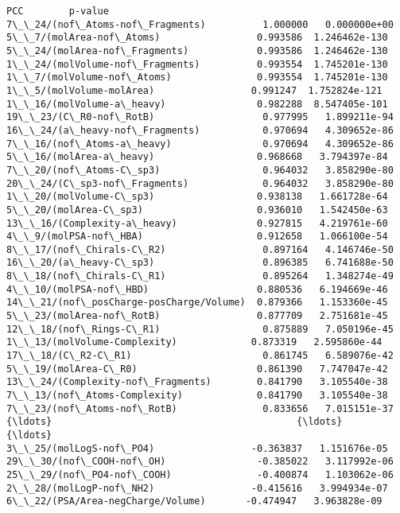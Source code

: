 \documentclass[11pt]{article}
\begin{document}
    \begin{Verbatim}[commandchars=\\\{\}]
                                              PCC        p-value
7\_\_24/(nof\_Atoms-nof\_Fragments)          1.000000   0.000000e+00
5\_\_7/(molArea-nof\_Atoms)                 0.993586  1.246462e-130
5\_\_24/(molArea-nof\_Fragments)            0.993586  1.246462e-130
1\_\_24/(molVolume-nof\_Fragments)          0.993554  1.745201e-130
1\_\_7/(molVolume-nof\_Atoms)               0.993554  1.745201e-130
1\_\_5/(molVolume-molArea)                 0.991247  1.752824e-121
1\_\_16/(molVolume-a\_heavy)                0.982288  8.547405e-101
19\_\_23/(C\_R0-nof\_RotB)                   0.977995   1.899211e-94
16\_\_24/(a\_heavy-nof\_Fragments)           0.970694   4.309652e-86
7\_\_16/(nof\_Atoms-a\_heavy)                0.970694   4.309652e-86
5\_\_16/(molArea-a\_heavy)                  0.968668   3.794397e-84
7\_\_20/(nof\_Atoms-C\_sp3)                  0.964032   3.858290e-80
20\_\_24/(C\_sp3-nof\_Fragments)             0.964032   3.858290e-80
1\_\_20/(molVolume-C\_sp3)                  0.938138   1.661728e-64
5\_\_20/(molArea-C\_sp3)                    0.936010   1.542450e-63
13\_\_16/(Complexity-a\_heavy)              0.927815   4.219761e-60
4\_\_9/(molPSA-nof\_HBA)                    0.912658   1.066100e-54
8\_\_17/(nof\_Chirals-C\_R2)                 0.897164   4.146746e-50
16\_\_20/(a\_heavy-C\_sp3)                   0.896385   6.741688e-50
8\_\_18/(nof\_Chirals-C\_R1)                 0.895264   1.348274e-49
4\_\_10/(molPSA-nof\_HBD)                   0.880536   6.194669e-46
14\_\_21/(nof\_posCharge-posCharge/Volume)  0.879366   1.153360e-45
5\_\_23/(molArea-nof\_RotB)                 0.877709   2.751681e-45
12\_\_18/(nof\_Rings-C\_R1)                  0.875889   7.050196e-45
1\_\_13/(molVolume-Complexity)             0.873319   2.595860e-44
17\_\_18/(C\_R2-C\_R1)                       0.861745   6.589076e-42
5\_\_19/(molArea-C\_R0)                     0.861390   7.747047e-42
13\_\_24/(Complexity-nof\_Fragments)        0.841790   3.105540e-38
7\_\_13/(nof\_Atoms-Complexity)             0.841790   3.105540e-38
7\_\_23/(nof\_Atoms-nof\_RotB)               0.833656   7.015151e-37
{\ldots}                                           {\ldots}            {\ldots}
3\_\_25/(molLogS-nof\_PO4)                 -0.363837   1.151676e-05
29\_\_30/(nof\_COOH-nof\_OH)                -0.385022   3.117992e-06
25\_\_29/(nof\_PO4-nof\_COOH)               -0.400874   1.103062e-06
2\_\_28/(molLogP-nof\_NH2)                 -0.415616   3.994934e-07
6\_\_22/(PSA/Area-negCharge/Volume)       -0.474947   3.963828e-09

\end{Verbatim}
\end{document}
